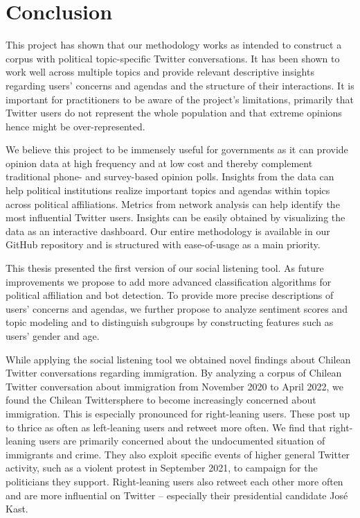 \section{Conclusion}\label{sec_conc}
    This project has shown that our methodology works as intended to construct a corpus with political topic-specific Twitter conversations. It has been shown to work well across multiple topics and provide relevant descriptive insights regarding users' concerns and agendas and the structure of their interactions. It is important for practitioners to be aware of the project’s limitations, primarily that Twitter users do not represent the whole population and that extreme opinions hence might be over-represented. %
    
    We believe this project to be immensely useful for governments as it can provide opinion data at high frequency and at low cost and thereby complement traditional phone- and survey-based opinion polls. Insights from the data can help political institutions realize important topics and agendas within topics across political affiliations. Metrics from network analysis can help identify the most influential Twitter users. Insights can be easily obtained by visualizing the data as an interactive dashboard. %
    Our entire methodology is available in our GitHub repository and is structured with ease-of-usage as a main priority.

    This thesis presented the first version of our social listening tool. As future improvements we propose to add more advanced classification algorithms for political affiliation and bot detection. To provide more precise descriptions of users' concerns and agendas, we further propose to analyze sentiment scores and topic modeling and to distinguish subgroups by constructing features such as users' gender and age.
    
    While applying the social listening tool we obtained novel findings about Chilean Twitter conversations regarding immigration. By analyzing a corpus of Chilean Twitter conversation about immigration from November 2020 to April 2022, we found the Chilean Twittersphere to become increasingly concerned about immigration. This is especially pronounced for right-leaning users. These post up to thrice as often as left-leaning users and retweet more often. We find that right-leaning users are primarily concerned about the undocumented situation of immigrants and crime. They also exploit specific events of higher general Twitter activity, such as a violent protest in September 2021, to campaign for the politicians they support. Right-leaning users also retweet each other more often and are more influential on Twitter -- especially their presidential candidate José Kast. 
    
